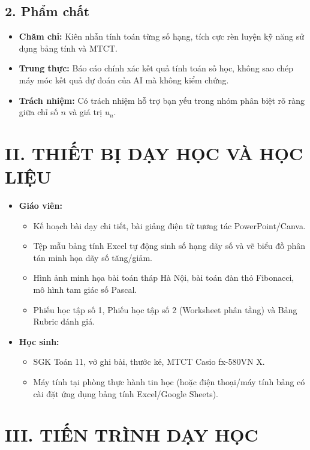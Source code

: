 \documentclass[12pt, a4paper]{article}
\begin{document}
\subsection*{2. Phẩm chất}  
\begin{itemize}[leftmargin=1.2cm]  
    \item \textbf{Chăm chỉ:} Kiên nhẫn tính toán từng số hạng, tích cực rèn luyện kỹ năng sử dụng bảng tính và MTCT.  
    \item \textbf{Trung thực:} Báo cáo chính xác kết quả tính toán số học, không sao chép máy móc kết quả dự đoán của AI mà không kiểm chứng.  
    \item \textbf{Trách nhiệm:} Có trách nhiệm hỗ trợ bạn yếu trong nhóm phân biệt rõ ràng giữa chỉ số $n$ và giá trị $u_n$.  
\end{itemize}  
  
\section*{II. THIẾT BỊ DẠY HỌC VÀ HỌC LIỆU}  
\begin{itemize}[leftmargin=1.2cm]  
    \item \textbf{Giáo viên:}  
    \begin{itemize}[leftmargin=0.6cm]  
        \item Kế hoạch bài dạy chi tiết, bài giảng điện tử tương tác PowerPoint/Canva.  
        \item Tệp mẫu bảng tính Excel tự động sinh số hạng dãy số và vẽ biểu đồ phân tán minh họa dãy số tăng/giảm.  
        \item Hình ảnh minh họa bài toán tháp Hà Nội, bài toán đàn thỏ Fibonacci, mô hình tam giác số Pascal.  
        \item Phiếu học tập số 1, Phiếu học tập số 2 (Worksheet phân tầng) và Bảng Rubric đánh giá.  
    \end{itemize}  
    \item \textbf{Học sinh:}  
    \begin{itemize}[leftmargin=0.6cm]  
        \item SGK Toán 11, vở ghi bài, thước kẻ, MTCT Casio fx-580VN X.  
        \item Máy tính tại phòng thực hành tin học (hoặc điện thoại/máy tính bảng có cài đặt ứng dụng bảng tính Excel/Google Sheets).  
    \end{itemize}  
\end{itemize}  
  
\section*{III. TIẾN TRÌNH DẠY HỌC}  
  
\end{document}
